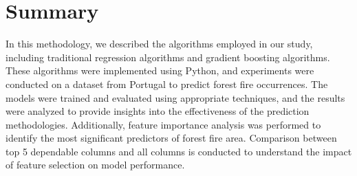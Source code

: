 \section {Summary}
In this methodology, we described the algorithms employed in our study, including traditional regression algorithms and gradient boosting algorithms. These algorithms were implemented using Python, and experiments were conducted on a dataset from Portugal to predict forest fire occurrences. The models were trained and evaluated using appropriate techniques, and the results were analyzed to provide insights into the effectiveness of the prediction methodologies. Additionally, feature importance analysis was performed to identify the most significant predictors of forest fire area. Comparison between top 5 dependable columns and all columns is conducted to understand the impact of feature selection on model performance.